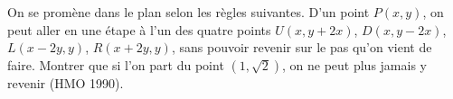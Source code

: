 On se promène dans le plan selon les règles suivantes. D'un point $P(x, y)$, on peut aller en une étape à l'un des quatre points $U(x, y + 2x)$, $D(x, y - 2x)$, $L(x - 2y, y)$, $R(x + 2y, y)$, sans pouvoir revenir sur le pas qu'on vient de faire. Montrer que si l'on part du point $(1, \sqrt{2})$, on ne peut plus jamais y revenir (HMO 1990).

